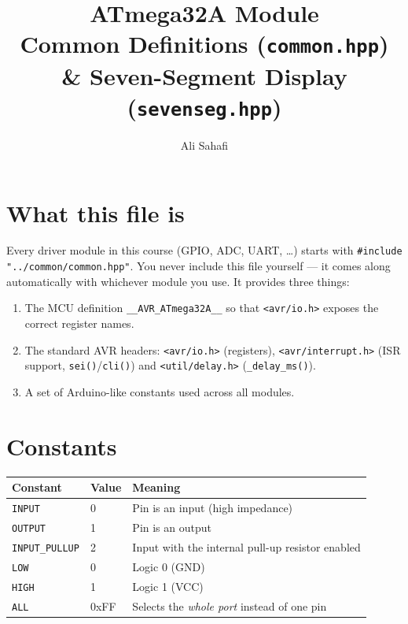 \documentclass[11pt,a4paper]{article}
\title{ATmega32A Module \\ \Large Common Definitions (\texttt{common.hpp}) \\ \Large \& Seven-Segment Display (\texttt{sevenseg.hpp})}
\author{Ali Sahafi}
\date{}
\begin{document}
\maketitle

\section{What this file is}

Every driver module in this course (GPIO, ADC, UART, \dots) starts with
\lstinline|#include "../common/common.hpp"|. You never include this file
yourself --- it comes along automatically with whichever module you use.
It provides three things:

\begin{enumerate}
  \item The MCU definition \texttt{\_\_AVR\_ATmega32A\_\_} so that
        \texttt{<avr/io.h>} exposes the correct register names.
  \item The standard AVR headers: \texttt{<avr/io.h>} (registers),
        \texttt{<avr/interrupt.h>} (ISR support, \texttt{sei()}/\texttt{cli()}) and
        \texttt{<util/delay.h>} (\texttt{\_delay\_ms()}).
  \item A set of Arduino-like constants used across all modules.
\end{enumerate}

\section{Constants}

\begin{center}
\begin{tabular}{lll}
\toprule
\textbf{Constant} & \textbf{Value} & \textbf{Meaning} \\
\midrule
\texttt{INPUT}        & 0    & Pin is an input (high impedance) \\
\texttt{OUTPUT}       & 1    & Pin is an output \\
\texttt{INPUT\_PULLUP} & 2    & Input with the internal pull-up resistor enabled \\
\texttt{LOW}          & 0    & Logic 0 (GND) \\
\texttt{HIGH}         & 1    & Logic 1 (VCC) \\
\texttt{ALL}          & 0xFF & Selects the \emph{whole port} instead of one pin \\
\bottomrule
\end{tabular}
\end{center}
\end{document}
